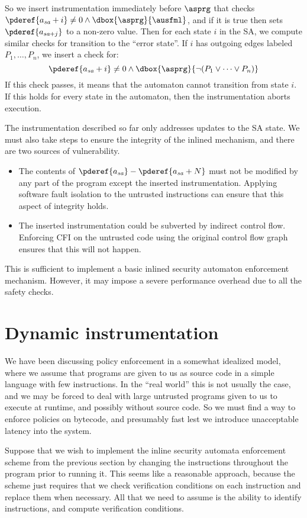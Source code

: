 \documentclass[11pt,twoside]{scrartcl}
\begin{document}
So we insert instrumentation immediately before $\asprg$ that checks $\pderef{a_{\textit{sa}}+i} \ne 0 \land \dbox{\asprg}{\ausfml}$, and if it is true then sets $\pderef{a_{\textit{sa}+j}}$ to a non-zero value. Then for each state $i$ in the SA, we compute similar checks for transition to the ``error state''. If $i$ has outgoing edges labeled $P_1, \ldots, P_n$, we insert a check for:
\begin{equation}
\pderef{a_{\textit{sa}}+i} \ne 0 \land \dbox{\asprg}{\lnot(P_1 \lor \cdots \lor P_n)}
\end{equation}
If this check passes, it means that the automaton cannot transition from state $i$. If this holds for every state in the automaton, then the instrumentation aborts execution.

The instrumentation described so far only addresses updates to the SA state. We must also take steps to ensure the integrity of the inlined mechanism, and there are two sources of vulnerability.
\begin{itemize}
\item The contents of $\pderef{a_{\textit{sa}}} - \pderef{a_{\textit{sa}}+N}$ must not be modified by any part of the program except the inserted instrumentation. Applying software fault isolation to the untrusted instructions can ensure that this aspect of integrity holds.
\item The inserted instrumentation could be subverted by indirect control flow. Enforcing CFI on the untrusted code using the original control flow graph ensures that this will not happen.
\end{itemize}
This is sufficient to implement a basic inlined security automaton enforcement mechanism. However, it may impose a severe performance overhead due to all the safety checks.

\section{Dynamic instrumentation}
We have been discussing policy enforcement in a somewhat idealized model, where we assume that programs are given to us as source code in a simple language with few instructions. In the ``real world'' this is not usually the case, and we may be forced to deal with large untrusted programs given to us to execute at runtime, and possibly without source code. So we must find a way to enforce policies on bytecode, and presumably fast lest we introduce unacceptable latency into the system.

Suppose that we wish to implement the inline security automata enforcement scheme from the previous section by changing the instructions throughout the program prior to running it. This seems like a reasonable approach, because the scheme just requires that we check verification conditions on each instruction and replace them when necessary. All that we need to assume is the ability to identify instructions, and compute verification conditions.
\end{document}
